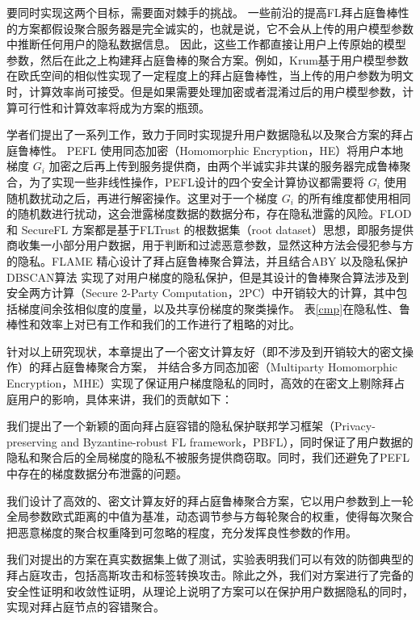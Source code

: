 要同时实现这两个目标，需要面对棘手的挑战。
一些前沿的提高FL拜占庭鲁棒性的方案\cite{blanchard2017machine, guerraoui2018hidden, yin2018byzantine}都假设聚合服务器是完全诚实的，也就是说，它不会从上传的用户模型参数中推断任何用户的隐私数据信息。
因此，这些工作都直接让用户上传原始的模型参数，然后在此之上构建拜占庭鲁棒的聚合方案。例如，Krum\cite{blanchard2017machine}基于用户模型参数在欧氏空间的相似性实现了一定程度上的拜占庭鲁棒性，当上传的用户参数为明文时，计算效率尚可接受。但是如果需要处理加密或者混淆过后的用户模型参数，计算可行性和计算效率将成为方案的瓶颈。

学者们提出了一系列工作\cite{liu2021privacy, dong2021flod, nguyen2022flame, hao2021efficient, so2020byzantine}，致力于同时实现提升用户数据隐私以及聚合方案的拜占庭鲁棒性。
PEFL\cite{liu2021privacy} 使用同态加密（Homomorphic Encryption，HE）将用户本地梯度 $G_i$ 加密之后再上传到服务提供商，由两个半诚实非共谋的服务器完成鲁棒聚合，为了实现一些非线性操作，PEFL设计的四个安全计算协议都需要将 $G_i$ 使用随机数扰动之后，再进行解密操作。这里对于一个梯度 $G_i$ 的所有维度都使用相同的随机数进行扰动，这会泄露梯度数据的数据分布，存在隐私泄露的风险。FLOD \cite{dong2021flod} 和 SecureFL \cite{hao2021efficient} 方案都是基于FLTrust \cite{cao2020fltrust} 的根数据集（root dataset）思想，即服务提供商收集一小部分用户数据，用于判断和过滤恶意参数，显然这种方法会侵犯参与方的隐私。FLAME \cite{nguyen2022flame} 精心设计了拜占庭鲁棒聚合算法，并且结合ABY\cite{demmler2015aby} 以及隐私保护DBSCAN算法 \cite{bozdemir2021privacy} 实现了对用户梯度的隐私保护，但是其设计的鲁棒聚合算法涉及到安全两方计算（Secure 2-Party Computation，2PC）中开销较大的计算，其中包括梯度间余弦相似度的度量，以及共享份梯度的聚类操作。
表\ref{cmp}在隐私性、鲁棒性和效率上对已有工作和我们的工作进行了粗略的对比。

针对以上研究现状，本章提出了一个密文计算友好（即不涉及到开销较大的密文操作）的拜占庭鲁棒聚合方案，
并结合多方同态加密（Multiparty Homomorphic Encryption，MHE）实现了保证用户梯度隐私的同时，高效的在密文上剔除拜占庭用户的影响，具体来讲，我们的贡献如下：
\begin{compactenum}
	\item  我们提出了一个新颖的面向拜占庭容错的隐私保护联邦学习框架（Privacy-preserving and Byzantine-robust FL framework，PBFL），同时保证了用户数据的隐私和聚合后的全局梯度的隐私不被服务提供商窃取。同时，我们还避免了PEFL\cite{liu2021privacy}中存在的梯度数据分布泄露的问题。
	\item 我们设计了高效的、密文计算友好的拜占庭鲁棒聚合方案，它以用户参数到上一轮全局参数欧式距离的中值为基准，动态调节参与方每轮聚合的权重，使得每次聚合把恶意梯度的聚合权重降到可忽略的程度，充分发挥良性参数的作用。
	\item 我们对提出的方案在真实数据集上做了测试，实验表明我们可以有效的防御典型的拜占庭攻击，包括高斯攻击和标签转换攻击。除此之外，我们对方案进行了完备的安全性证明和收敛性证明，从理论上说明了方案可以在保护用户数据隐私的同时，实现对拜占庭节点的容错聚合。
\end{compactenum}

